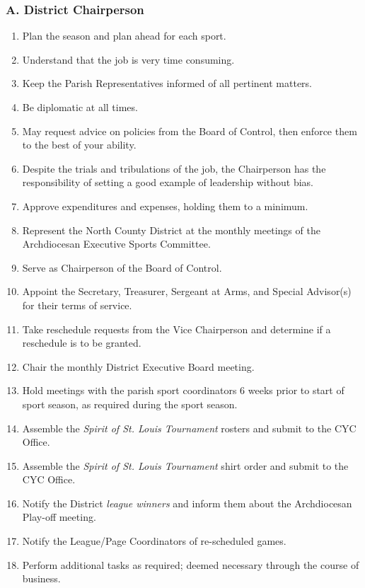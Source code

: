 \subsubsection{A. District Chairperson}
\label{ssec:rules-g-3a}
\begin{enumerate}[1.]
    \item Plan the season and plan ahead for each sport.
    \item Understand that the job is very time consuming.
    \item Keep the Parish Representatives informed of all pertinent matters.
    \item Be diplomatic at all times.
    \item May request advice on policies from the Board of Control, then enforce them to the best of your ability.
    \item Despite the trials and tribulations of the job, the Chairperson has the responsibility of setting a good example of leadership without bias.
    \item Approve expenditures and expenses, holding them to a minimum.
    \item Represent the North County District at the monthly meetings of the Archdiocesan Executive Sports Committee.
    \item Serve as Chairperson of the Board of Control.
    \item Appoint the Secretary, Treasurer, Sergeant at Arms, and Special Advisor(s) for their terms of service.
    \item Take reschedule requests from the Vice Chairperson and determine if a reschedule is to be granted.
    \item Chair the monthly District Executive Board meeting.
    \item Hold meetings with the parish sport coordinators 6 weeks prior to start of sport season, as required during the sport season.
    \item Assemble the {\em Spirit of St. Louis Tournament} rosters and submit to the CYC Office.
    \item Assemble the {\em Spirit of St. Louis Tournament} shirt order and submit to the CYC Office.
    \item Notify the District {\em league winners} and inform them about the Archdiocesan Play-off meeting.
    \item Notify the League/Page Coordinators of re-scheduled games.
    \item Perform additional tasks as required; deemed necessary through the course of business.
\end{enumerate}


